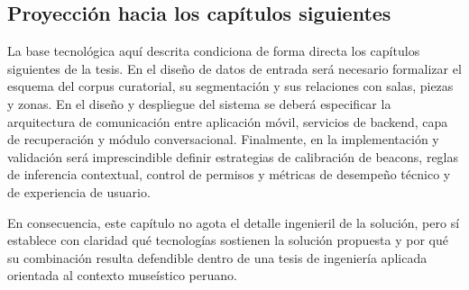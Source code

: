\subsection{Proyección hacia los capítulos siguientes}

La base tecnológica aquí descrita condiciona de forma directa los capítulos siguientes de la tesis. En el diseño de datos de entrada será necesario formalizar el esquema del corpus curatorial, su segmentación y sus relaciones con salas, piezas y zonas. En el diseño y despliegue del sistema se deberá especificar la arquitectura de comunicación entre aplicación móvil, servicios de backend, capa de recuperación y módulo conversacional. Finalmente, en la implementación y validación será imprescindible definir estrategias de calibración de beacons, reglas de inferencia contextual, control de permisos y métricas de desempeño técnico y de experiencia de usuario.

En consecuencia, este capítulo no agota el detalle ingenieril de la solución, pero sí establece con claridad qué tecnologías sostienen la solución propuesta y por qué su combinación resulta defendible dentro de una tesis de ingeniería aplicada orientada al contexto museístico peruano.
